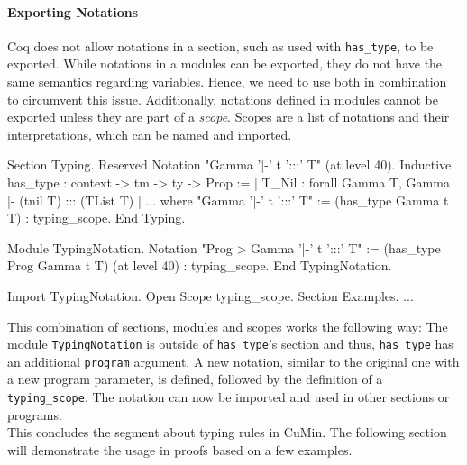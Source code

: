 \documentclass[paper = a4, fleqn, twoside]{scrreprt}
\newcommand{\coqinline}[1]{\texttt{#1}}
\begin{document}
\paragraph{Exporting Notations}
Coq does not allow notations in a section, such as used with \coqinline{has_type}, to be exported. While notations in a modules can be exported, they do not have the same semantics regarding variables. Hence, we need to use both in combination to circumvent this issue. Additionally, notations defined in modules cannot be exported unless they are part of a \textit{scope}. Scopes are a list of notations and their interpretations, which can be named and imported.
\begin{coqcode}
Section Typing.
  Reserved Notation "Gamma '|-' t ':::' T" (at level 40).
  Inductive has_type : context -> tm -> ty -> Prop :=
    | T_Nil : forall Gamma T, Gamma |- (tnil T) ::: (TList T)
    | ...
  where "Gamma '|-' t ':::' T" := (has_type Gamma t T) : typing_scope.
End Typing.

Module TypingNotation.
  Notation "Prog > Gamma '|-' t ':::' T" := (has_type Prog Gamma t T)
    (at level 40) : typing_scope.
End TypingNotation.

Import TypingNotation. Open Scope typing_scope.
Section Examples. ...
\end{coqcode}
This combination of sections, modules and scopes works the following way: The module \texttt{TypingNotation} is outside of \coqinline{has_type}'s section and thus, \coqinline{has_type} has an additional \coqinline{program} argument. A new notation, similar to the original one with a new program parameter, is defined, followed by the definition of a \coqinline{typing_scope}.
The notation can now be imported and used in other sections or programs. \\
This concludes the segment about typing rules in CuMin. The following section will demonstrate the usage in proofs based on a few examples.
\end{document}
